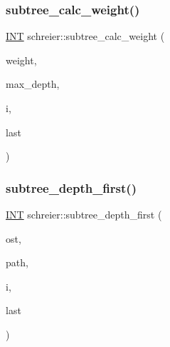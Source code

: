 \subsubsection{\texorpdfstring{subtree\+\_\+calc\+\_\+weight()}{subtree\_calc\_weight()}}
{\footnotesize\ttfamily \mbox{\hyperlink{galois_8h_a09fddde158a3a20bd2dcadb609de11dc}{I\+NT}} schreier\+::subtree\+\_\+calc\+\_\+weight (\begin{DoxyParamCaption}\item[{\mbox{\hyperlink{galois_8h_a09fddde158a3a20bd2dcadb609de11dc}{I\+NT}} $\ast$}]{weight,  }\item[{\mbox{\hyperlink{galois_8h_a09fddde158a3a20bd2dcadb609de11dc}{I\+NT}} \&}]{max\+\_\+depth,  }\item[{\mbox{\hyperlink{galois_8h_a09fddde158a3a20bd2dcadb609de11dc}{I\+NT}}}]{i,  }\item[{\mbox{\hyperlink{galois_8h_a09fddde158a3a20bd2dcadb609de11dc}{I\+NT}}}]{last }\end{DoxyParamCaption})}

\mbox{\label{classschreier_a7999505b1f9db756bdb99abd0effba3a}} 
\subsubsection{\texorpdfstring{subtree\+\_\+depth\+\_\+first()}{subtree\_depth\_first()}}
{\footnotesize\ttfamily \mbox{\hyperlink{galois_8h_a09fddde158a3a20bd2dcadb609de11dc}{I\+NT}} schreier\+::subtree\+\_\+depth\+\_\+first (\begin{DoxyParamCaption}\item[{ostream \&}]{ost,  }\item[{\mbox{\hyperlink{galois_8h_a09fddde158a3a20bd2dcadb609de11dc}{I\+NT}} $\ast$}]{path,  }\item[{\mbox{\hyperlink{galois_8h_a09fddde158a3a20bd2dcadb609de11dc}{I\+NT}}}]{i,  }\item[{\mbox{\hyperlink{galois_8h_a09fddde158a3a20bd2dcadb609de11dc}{I\+NT}}}]{last }\end{DoxyParamCaption})}

\mbox{\label{classschreier_a9da8319f33b4a042e13709356e9d9922}} 
